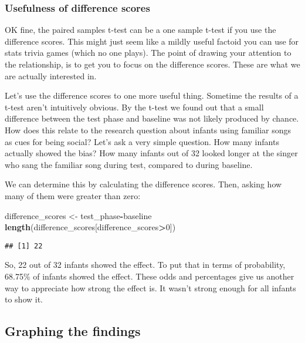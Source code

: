\documentclass[
]{book}
\newenvironment{Shaded}{\begin{snugshade}}{\end{snugshade}}
\newcommand{\DecValTok}[1]{\textcolor[rgb]{0.00,0.00,0.81}{#1}}
\newcommand{\FunctionTok}[1]{\textcolor[rgb]{0.13,0.29,0.53}{\textbf{#1}}}
\newcommand{\NormalTok}[1]{#1}
\newcommand{\OtherTok}[1]{\textcolor[rgb]{0.56,0.35,0.01}{#1}}
\newcommand{\SpecialCharTok}[1]{\textcolor[rgb]{0.81,0.36,0.00}{\textbf{#1}}}
\begin{document}
\hypertarget{usefulness-of-difference-scores}{%
\subsubsection{Usefulness of difference scores}\label{usefulness-of-difference-scores}}

OK fine, the paired samples t-test can be a one sample t-test if you use the difference scores. This might just seem like a mildly useful factoid you can use for stats trivia games (which no one plays). The point of drawing your attention to the relationship, is to get you to focus on the difference scores. These are what we are actually interested in.

Let's use the difference scores to one more useful thing. Sometime the results of a t-test aren't intuitively obvious. By the t-test we found out that a small difference between the test phase and baseline was not likely produced by chance. How does this relate to the research question about infants using familiar songs as cues for being social? Let's ask a very simple question. How many infants actually showed the bias? How many infants out of 32 looked longer at the singer who sang the familiar song during test, compared to during baseline.

We can determine this by calculating the difference scores. Then, asking how many of them were greater than zero:

\begin{Shaded}
\begin{Highlighting}[]
\NormalTok{difference\_scores }\OtherTok{\textless{}{-}}\NormalTok{ test\_phase}\SpecialCharTok{{-}}\NormalTok{baseline}
\FunctionTok{length}\NormalTok{(difference\_scores[difference\_scores}\SpecialCharTok{\textgreater{}}\DecValTok{0}\NormalTok{])}
\end{Highlighting}
\end{Shaded}

\begin{verbatim}
## [1] 22
\end{verbatim}

So, 22 out of 32 infants showed the effect. To put that in terms of probability, 68.75\% of infants showed the effect. These odds and percentages give us another way to appreciate how strong the effect is. It wasn't strong enough for all infants to show it.

\hypertarget{graphing-the-findings}{%
\subsection{Graphing the findings}\label{graphing-the-findings}}
\end{document}
